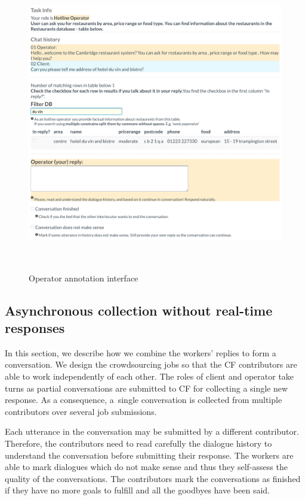 \documentclass[runningheads,a4paper]{llncs}
\begin{document}
\begin{figure}[tb]
\vspace{-1.00em}
\begin{center}
\includegraphics[height=35em]{gui-annotators-system}
\caption{Operator annotation interface}
\end{center}
\vspace{-1.00em}
\label{fig:operator}
\end{figure}
\vspace{-1.00em}

\vspace{-1.00em}
\subsection{Asynchronous collection without real-time responses}
\label{sec:async}
In this section, we describe how we combine the workers' replies to form a conversation.
We design the crowdsourcing jobs so that the CF contributors are able to work independently of each other.
The roles of client and operator take turns as partial conversations are submitted to CF for collecting a single new response.
As a consequence, a~single conversation is collected from multiple contributors over several job submissions.

Each utterance in the conversation may be submitted by a different contributor. Therefore, the contributors need to read carefully the dialogue history to understand the conversation before submitting their response.
The workers are able to mark dialogues which do not make sense and thus they self-assess the quality of the conversations.
The contributors mark the conversations as finished if they have no more goals to fulfill and all the goodbyes have been said.
\end{document}
